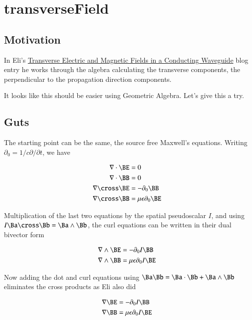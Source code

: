

\chapter{transverseField}
\label{chap:transverseField}
{}
\date{July 30, 2009}

\beginArtWithToc

\section{Motivation}

In Eli's \href{http://behindtheguesses.blogspot.com/2009/07/transverse-electric-and-magnetic-fields.html}{Transverse Electric and Magnetic Fields in a Conducting Waveguide} blog entry he works through the algebra calculating the transverse components, the perpendicular to the propagation direction components.

It looks like this should be easier using Geometric Algebra.  Let's give this a try.

\section{Guts}

The starting point can be the same, the source free Maxwell's equations.  Writing $\partial_0 = 1/c \partial/{\partial t}$, we have

\begin{align*}
\grad \cdot \BE &= 0 \\
\grad \cdot \BB &= 0 \\
\grad \cross \BE &= - \partial_0 \BB \\
\grad \cross \BB &= \mu \epsilon \partial_0 \BE
\end{align*}

Multiplication of the last two equations by the spatial pseudoscalar $I$, and using $I \Ba \cross \Bb = \Ba \wedge \Bb$, the curl equations can be written in their dual bivector form

\begin{align*}
\grad \wedge \BE &= - \partial_0 I \BB \\
\grad \wedge \BB &= \mu \epsilon \partial_0 I \BE
\end{align*}

Now adding the dot and curl equations using $\Ba \Bb = \Ba \cdot \Bb + \Ba \wedge \Bb$ eliminates the cross products as Eli also did

\begin{align*}
\grad \BE &= - \partial_0 I \BB \\
\grad \BB &= \mu \epsilon \partial_0 I \BE
\end{align*}



\EndNoBibArticle
